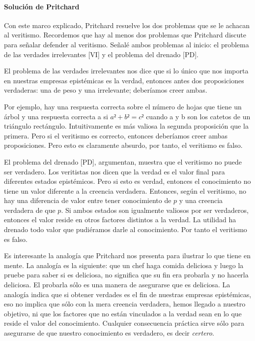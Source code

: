 \paragraph{Solución de Pritchard}

Con este marco explicado, Pritchard resuelve los dos problemas que se le achacan al veritismo.
Recordemos que hay al menos dos problemas que Pritchard discute para señalar defender al veritismo.
Señalé ambos problemas al inicio: el problema de las verdades irrelevantes [VI] y el problema del drenado [PD].

El problema de las verdades irrelevantes nos dice que si lo único que nos importa en nuestras empresas epistémicas es la verdad, entonces antes dos proposiciones verdaderas: una de peso y una irrelevante; deberíamos creer ambas.

Por ejemplo, hay una respuesta correcta sobre el número de hojas que tiene un árbol y una respuesta correcta a si $a² + b² = c²$ cuando a y b son los catetos de un triángulo rectángulo.
Intuitivamente es más valiosa la segunda proposición que la primera.
Pero si el veritismo es correcto, entonces deberíamos creer ambas proposiciones.
Pero esto es claramente absurdo, por tanto, el veritismo es falso.

El problema del drenado [PD], argumentan, muestra que el veritismo no puede ser verdadero.
Los veritistas nos dicen que la verdad es el valor final para diferentes estados epistémicos.
Pero si esto es verdad, entonces el conocimiento no tiene un valor diferente a la creencia verdadera.
Entonces, según el veritismo, no hay una diferencia de valor entre tener conocimiento de $p$ y una creencia verdadera de que $p$.
Si ambos estados son igualmente valiosos por ser verdaderos, entonces el valor reside en otros factores distintos a la verdad.
La utilidad ha drenado todo valor que pudiéramos darle al conocimiento.
Por tanto el veritismo es falso.

Es interesante la analogía que Pritchard nos presenta para ilustrar lo que tiene en mente.
La analogía es la siguiente: que un chef haga comida deliciosa y luego la pruebe para saber si es deliciosa, no significa que su fin era probarla y no hacerla deliciosa.
El probarla sólo es una manera de asegurarse que es deliciosa.
La analogía indica que si obtener verdades es el fin de nuestras empresas epistémicas, eso no implica que sólo con la mera creencia verdadera, hemos llegado a nuestro objetivo, ni que los factores que no están vinculados a la verdad sean en lo que reside el valor del conocimiento.
Cualquier consecuencia práctica sirve sólo para asegurarse de que nuestro conocimiento es verdadero, es decir \emph{certero}. 

